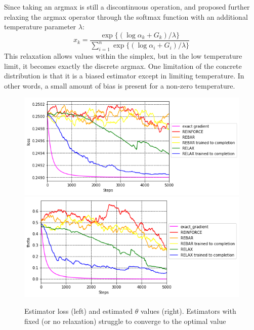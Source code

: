 \documentclass{article}
\begin{document}
Since taking an argmax is still a discontinuous operation, \cite{maddison2016concrete} and \cite{jang2016categorical} proposed further relaxing the argmax operator through the softmax function with an additional temperature parameter $\lambda$:
\begin{equation}
x_k = \frac{\exp\{( \log \alpha_k+ G_k) / \lambda\}}{\sum_{i=1}^n\exp\{( \log \alpha_i+ G_i) / \lambda\}}
\end{equation}
This relaxation allows values within the simplex, but in the low temperature limit, it becomes exactly the discrete argmax.
One limitation of the concrete distribution is that it is a biased estimator except in limiting temperature.
In other words, a small amount of bias is present for a non-zero temperature.



\begin{figure}
\begin{center}
\includegraphics[scale=.33]{figures/losses}
\includegraphics[scale=.33]{figures/theta}
\end{center}
\label{fig:toy_loss}
\caption{Estimator loss (left) and estimated $\theta$ values (right). Estimators with fixed (or no relaxation) struggle to converge to the optimal value}
\end{figure}
\end{document}
